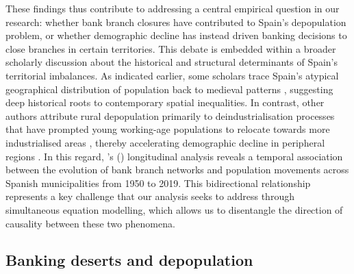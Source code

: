 \documentclass[a4paper,11pt,oneside]{article}
\begin{document}
\begin{sloppypar}
These findings thus contribute to addressing a central empirical question in our research: whether bank branch closures \citep{bonfim2021sorry,martin2025closes} have contributed to Spain's depopulation problem, or whether demographic decline has instead driven banking decisions to close branches in certain territories. This debate is embedded within a broader scholarly discussion about the historical and structural determinants of Spain's territorial imbalances. As indicated earlier, some scholars trace Spain's atypical geographical distribution of population back to medieval patterns \citep{oto2016economic, oto2020frontiers}, suggesting deep historical roots to contemporary spatial inequalities. In contrast, other authors attribute rural depopulation primarily to deindustrialisation processes that have prompted young working-age populations to relocate towards more industrialised areas \citep[see][]{collantes2019lugares}, thereby accelerating demographic decline in peripheral regions \citep{camarero2020despoblamiento}. In this regard, \citeauthor{bandres2021despoblacion}'s (\citeyear{bandres2021despoblacion}) longitudinal analysis reveals a temporal association between the evolution of bank branch networks and population movements across Spanish municipalities from 1950 to 2019. This bidirectional relationship represents a key challenge that our analysis seeks to address through simultaneous equation modelling, which allows us to disentangle the direction of causality between these two phenomena.
\end{sloppypar}





\subsection{Banking deserts and depopulation}
\label{sec:banking_deserts}
\end{document}
